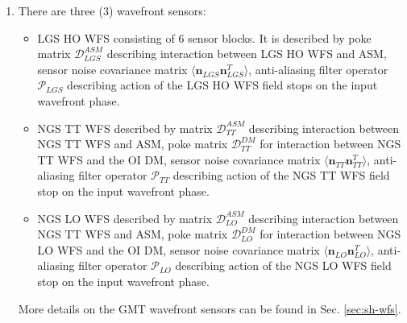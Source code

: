 \begin{enumerate}
	\item There are three (3) wavefront sensors:
	\begin{itemize}
		\item LGS HO WFS consisting of 6 sensor blocks. It is described by poke
		matrix $\mathcal{D}_{LGS}^{ASM}$ describing interaction between LGS HO WFS
		and ASM, sensor noise covariance matrix
		$\langle \bm{n}_{LGS}^{} \bm{n}_{LGS}^{T} \rangle$, anti-aliasing filter
		operator $\mathcal{P}_{LGS}$ describing action of the LGS HO WFS field
		stops on the input wavefront phase.
		\item NGS TT WFS described by matrix $\mathcal{D}_{TT}^{ASM}$ describing
		interaction between NGS TT WFS
		and ASM, poke matrix $\mathcal{D}_{TT}^{DM}$ for interaction between NGS
		TT WFS and the OI DM, sensor noise covariance matrix
		$\langle \bm{n}_{TT}^{} \bm{n}_{TT}^{T} \rangle$, anti-aliasing filter
		operator $\mathcal{P}_{TT}$ describing action of the NGS TT WFS field
		stop on the input wavefront phase.
		\item NGS LO WFS described by matrix $\mathcal{D}_{LO}^{ASM}$ describing
		interaction between NGS TT WFS
		and ASM, poke matrix $\mathcal{D}_{LO}^{DM}$ for interaction between NGS
		LO WFS and the OI DM, sensor noise covariance matrix
		$\langle \bm{n}_{LO}^{} \bm{n}_{LO}^{T} \rangle$, anti-aliasing filter
		operator $\mathcal{P}_{LO}$ describing action of the NGS LO WFS field
		stop on the input wavefront phase.
	\end{itemize}
	More details on the GMT wavefront sensors can be found in
	Sec. \ref{sec:sh-wfs}.


\end{enumerate}
